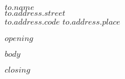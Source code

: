 \documentclass[DIN,
fromalign=right,
fromphone=false,
version=last,
parskip=full,paper=a4]{scrlttr2}
\begin{document}

\begin{letter}{
		$to.name$\\
		$to.address.street$\\
		$to.address.code$
		$to.address.place$
}
\opening{$opening$}
$body$
\closing{$closing$}

\end{letter}
\end{document}
